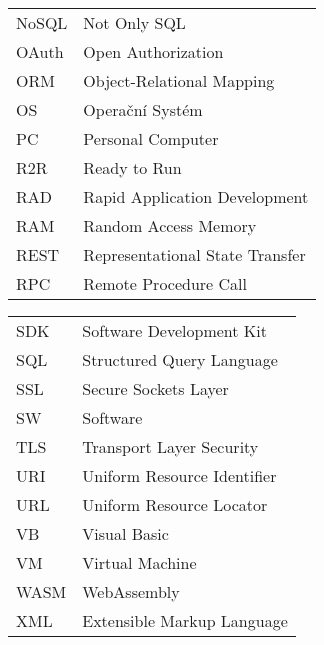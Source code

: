 \begin{tabular}{ll}
NoSQL & Not Only SQL \\
OAuth & Open Authorization \\
ORM & Object-Relational Mapping \\
OS & Operační Systém \\
PC & Personal Computer \\
R2R & Ready to Run \\
RAD & Rapid Application Development \\
RAM & Random Access Memory \\
REST & Representational State Transfer \\
RPC & Remote Procedure Call \\
\end{tabular}

\begin{tabular}{ll}
SDK & Software Development Kit \\
SQL & Structured Query Language \\
SSL & Secure Sockets Layer \\
SW & Software \\
TLS & Transport Layer Security \\
URI & Uniform Resource Identifier \\
URL & Uniform Resource Locator \\
VB & Visual Basic \\
VM & Virtual Machine \\
WASM & WebAssembly \\
XML & Extensible Markup Language \\
\end{tabular}

